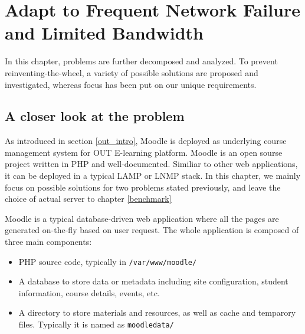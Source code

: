 \chapter{Adapt to Frequent Network Failure and Limited Bandwidth}\label{sync}
In this chapter, problems are further decomposed and analyzed. To prevent reinventing-the-wheel, a variety of possible solutions are proposed and investigated, whereas focus has been put on our unique requirements.




\section{A closer look at the problem} \label{components}
As introduced in section \ref{out_intro}, Moodle is deployed as underlying course management system for OUT E-learning platform. Moodle is an open sourse project written in PHP and well-documented\cite{aosamoodle}\cite{moodledoc}. Similiar to other web applications, it can be deployed in a typical LAMP or LNMP stack. In this chapter, we mainly focus on possible solutions for two problems stated previously, and leave the choice of actual server to chapter \ref{benchmark}

Moodle is a typical database-driven web application where all the pages are generated on-the-fly based on user request. The whole application is composed of three main components: 
\begin{itemize}
\item PHP source code, typically in \texttt{/var/www/moodle/}
\item A database to store data or metadata including site configuration, student information, course details, events, etc.
\item A directory to store materials and resources, as well as cache and temparory files. Typically it is named as \texttt{moodledata/}
\end{itemize}

